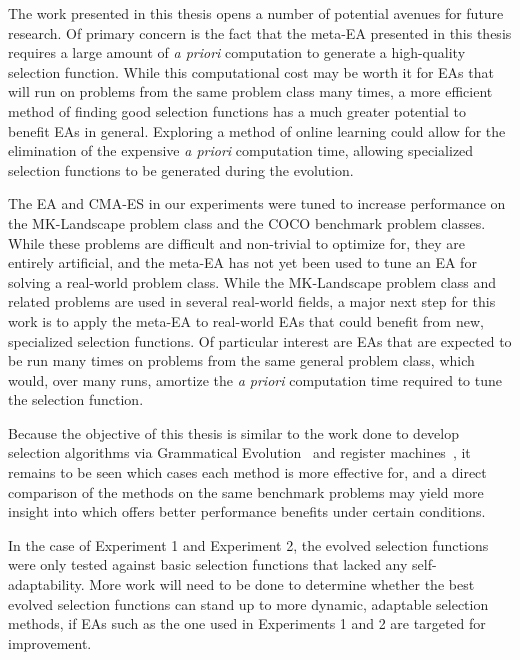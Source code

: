 \documentclass[times,12pt,titlepage]{mstogs}
\begin{document}
\begin{ThesisBody}
\label{Future Work}
The work presented in this thesis opens a number of potential avenues for future research. Of primary concern is the fact that the meta-EA presented in this thesis requires a large amount of \textit{a priori} computation to generate a high-quality selection function. While this computational cost may be worth it for EAs that will run on problems from the same problem class many times, a more efficient method of finding good selection functions has a much greater potential to benefit EAs in general. Exploring a method of online learning could allow for the elimination of the expensive \textit{a priori} computation time, allowing specialized selection functions to be generated during the evolution.

The EA and CMA-ES in our experiments were tuned to increase performance on the MK-Landscape problem class and the COCO benchmark problem classes. While these problems are difficult and non-trivial to optimize for, they are entirely artificial, and the meta-EA has not yet been used to tune an EA for solving a real-world problem class. While the MK-Landscape problem class and related problems are used in several real-world fields, a major next step for this work is to apply the meta-EA to real-world EAs that could benefit from new, specialized selection functions. Of particular interest are EAs that are expected to be run many times on problems from the same general problem class, which would, over many runs, amortize the \textit{a priori} computation time required to tune the selection function.

Because the objective of this thesis is similar to the work done to develop selection algorithms via Grammatical Evolution~\citep{lourencco2013selection} and register machines~\citep{woodward2011selection}, it remains to be seen which cases each method is more effective for, and a direct comparison of the methods on the same benchmark problems may yield more insight into which offers better performance benefits under certain conditions.

In the case of Experiment 1 and Experiment 2, the evolved selection functions were only tested against basic selection functions that lacked any self-adaptability. More work will need to be done to determine whether the best evolved selection functions can stand up to more dynamic, adaptable selection methods, if EAs such as the one used in Experiments 1 and 2 are targeted for improvement.


\end{ThesisBody}
\end{document}
